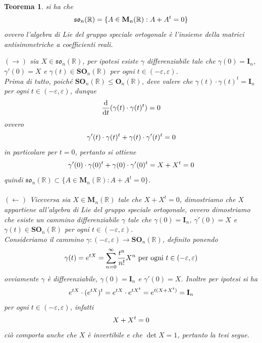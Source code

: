 \documentclass[oneside, 11pt]{amsbook}
\makeatletter
\newcommand{\0}{{(0)}}
\newcommand{\3}{{(3)}}
\theoremstyle{colonplain}
\newtheorem{thm}{Teorema}[chapter]
\theoremstyle{colondefinition}
\theoremstyle{colonremark}
\numberwithin{equation}{chapter}
\renewcommand{\proofname}{Dimostrazione}
\renewenvironment{proof}[1][\proofname]{\par
  \pushQED{\qed}%
  \normalfont \topsep6\p@\@plus6\p@\relax
  \trivlist
  \item[\hskip\labelsep\bfseries #1:]\ignorespaces
}{%
  \popQED\endtrivlist\@endpefalse
}
\makeatother
\begin{document}
\begin{thm} si ha che
\begin{align}
    \mathfrak{so}_n(\mathbb{R}) = \{ A \in \mathbf{M}_n(\mathbb{R}) : A + A^t = 0 \} \notag
\end{align}
ovvero l'algebra di Lie del gruppo speciale ortogonale è l'insieme della matrici antisimmetriche a coefficienti reali. \\

\begin{proof} $(\rightarrow)$ sia $X \in \mathfrak{so}_n(\mathbb{R})$, per ipotesi esiste $\gamma$ differenziabile tale che $\gamma(0) = \mathbf{I}_n$, $\gamma'(0) = X$ e $\gamma(t) \in \mathbf{SO}_n(\mathbb{R})$ per ogni $t \in (-\varepsilon, \varepsilon)$. \\
Prima di tutto, poiché $\mathbf{SO}_n(\mathbb{R}) \leq \mathbf{O}_n(\mathbb{R})$, deve valere che $\gamma(t) \cdot \gamma(t)^t = \mathbf{I}_n$ per ogni $t \in (-\varepsilon, \varepsilon)$, dunque
\begin{align}
    \frac{\mathrm{d}}{\mathrm{d}t} (\gamma(t) \cdot \gamma(t)^t) = 0 \notag
\end{align}
ovvero
\begin{align}
    \gamma'(t) \cdot \gamma(t)^t + \gamma(t) \cdot \gamma'(t)^t = 0 \notag
\end{align}
in particolare per $t = 0$, pertanto si ottiene
\begin{align}
    \gamma'(0) \cdot \gamma (0)^t + \gamma(0) \cdot \gamma'(0)^t = X + X^t = 0 \notag
\end{align}
quindi $\mathfrak{so}_n(\mathbb{R}) \subset \{ A \in \mathbf{M}_n(\mathbb{R}) : A + A^t = 0 \}$. \\ \\
$(\leftarrow)$ Viceversa sia $X \in \mathbf{M}_n(\mathbb{R})$ tale che $X + X^t = 0$, dimostriamo che $X$ appartiene all'algebra di Lie del gruppo speciale ortogonale, ovvero dimostriamo che esiste un cammino differenziabile $\gamma$ tale che $\gamma(0) = \mathbf{I}_n$, $\gamma'(0) = X$ e $\gamma(t) \in \mathbf{SO}_n(\mathbb{R})$ per ogni $t \in (-\varepsilon, \varepsilon)$. \\
Consideriamo il cammino $\gamma : (-\varepsilon, \varepsilon) \longrightarrow \mathbf{SO}_n(\mathbb{R})$, definito ponendo
\begin{align}
    \gamma(t) = e^{tX} = \sum_{n = 0}^\infty \frac{t^n}{n!}X^n \text{ per ogni } t \in (-\varepsilon, \varepsilon) \notag
\end{align}
ovviamente $\gamma$ è differenziabile, $\gamma(0) = \mathbf{I}_n$ e $\gamma'(0) = X$. Inoltre per ipotesi si ha
\begin{align}
    e^{tX} \cdot (e^{tX})^t = e^{tX} \cdot e^{tX^t} = e^{t(X + X^t)} = \mathbf{I}_n \notag
\end{align}
per ogni $t \in (-\varepsilon, \varepsilon)$, infatti
\begin{align}
    X + X^t = 0 \notag
\end{align}
ciò comporta anche che $X$ è invertibile e che $\det X = 1$, pertanto la tesi segue. \end{proof}
\end{thm}
\end{document}

